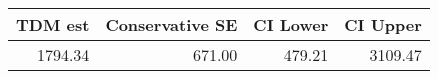 \begin{tabular}{rrrr}
  \hline
TDM est & Conservative SE & CI Lower & CI Upper \\ 
  \hline
1794.34 & 671.00 & 479.21 & 3109.47 \\ 
   \hline
\end{tabular}
